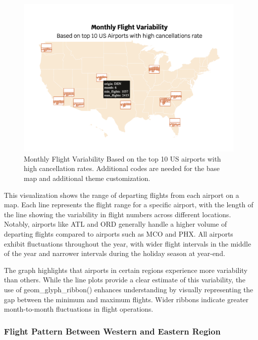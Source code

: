 \begin{figure}
\includegraphics[width=15.14in]{figures/monthly-flight-variability} \caption{Monthly Flight Variability Based on the top 10 US airports with high cancellation rates. Additional codes are needed for the base map and additional theme customization.}\label{fig:unnamed-chunk-25}
\end{figure}

This visualization shows the range of departing flights from each airport on a map. Each line represents the flight range for a specific airport, with the length of the line showing the variability in flight numbers across different locations. Notably, airports like ATL and ORD generally handle a higher volume of departing flights compared to airports such as MCO and PHX. All airports exhibit fluctuations throughout the year, with wider flight intervals in the middle of the year and narrower intervals during the holiday season at year-end.

The graph highlights that airports in certain regions experience more variability than others. While the line plots provide a clear estimate of this variability, the use of geom\_glyph\_ribbon() enhances understanding by visually representing the gap between the minimum and maximum flights. Wider ribbons indicate greater month-to-month fluctuations in flight operations.

\hypertarget{flight-pattern-between-western-and-eastern-region}{%
\subsubsection{Flight Pattern Between Western and Eastern Region}\label{flight-pattern-between-western-and-eastern-region}}

